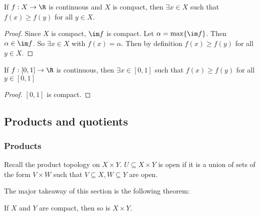 \documentclass[a4paper]{article}
\begin{document}
\begin{thm}
  If $f: X \to \R$ is continuous and $X$ is compact, then $\exists x\in X$ such that $f(x) \geq f(y)$ for all $y\in X$.
\end{thm}

\begin{proof}
  Since $X$ is compact, $\im f$ is compact. Let $\alpha = \max \{\im f\}$. Then $\alpha \in \im f$. So $\exists x\in X$ with $f(x) = \alpha$. Then by definition $f(x) \geq f(y)$ for all $y\in X$.
\end{proof}

\begin{cor}
  If $f: [0, 1] \to \R$ is continuous, then $\exists x\in [0, 1]$ such that $f(x) \geq f(y)$ for all $y\in [0, 1]$
\end{cor}

\begin{proof}
  $[0, 1]$ is compact.
\end{proof}

\subsection{Products and quotients}
\subsubsection{Products}
Recall the product topology on $X\times Y$. $U\subseteq X\times Y$ is open if it is a union of sets of the form $V\times W$ such that $V\subseteq X, W\subseteq Y$ are open.

The major takeaway of this section is the following theorem:
\begin{thm}
  If $X$ and $Y$ are compact, then so is $X\times Y$.
\end{thm}
\end{document}
